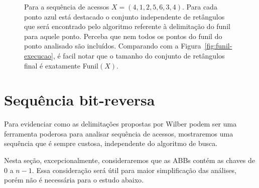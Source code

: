 \begin{figure}
    \caption{Para a sequência de acessos $X = (4,1,2,5,6,3,4)$. Para cada ponto azul está destacado o conjunto independente de retângulos que será encontrado pelo algoritmo referente à delimitação do funil para aquele ponto. Perceba que nem todos os pontos do funil do ponto analisado são incluídos. Comparando com a Figura~\ref{fig:funil-execucao}, é facil notar que o tamanho do conjunto de retângulos final é exatamente Funil$(X)$.}
\end{figure}

\section{Sequência bit-reversa}

Para evidenciar como as delimitações propostas por Wilber podem ser uma ferramenta poderosa para analisar sequência de acessos, mostraremos uma sequência que é sempre custosa, independente do algoritmo de busca. 

Nesta seção, excepcionalmente, consideraremos que as ABBs contém as chaves de $0$ a $n-1$. Essa consideração será útil para maior simplificação das análises, porém não é necessária para o estudo abaixo. 

